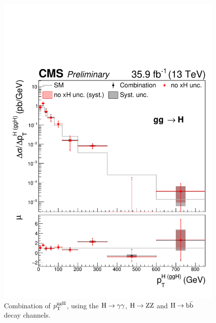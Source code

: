 \begin{figure}[hbtp]
  \begin{center}
    \includegraphics[width=\halflinewidth]{img/differentials/comparison_including_xH_unc.pdf}
    \caption{
        Combination of $p_\mathrm{T}^\text{ggH}$, using the $\mathrm{H}\to\mathrm{\gamma}\mathrm{\gamma}$, $\mathrm{H}\to\mathrm{Z}\mathrm{Z}$ and $\mathrm{H}\to\mathrm{b}\bar{\mathrm{b}}$ decay channels. 
        }
    \label{fig:xH_uncertainty_impact}
  \end{center}
\end{figure}

